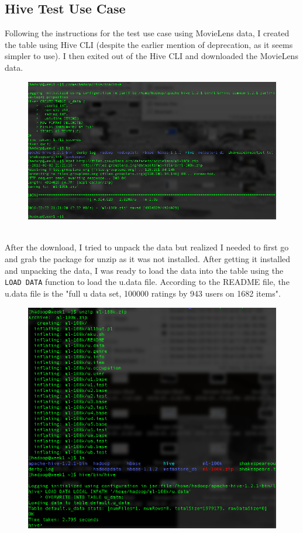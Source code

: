 \documentclass[10pt]{article}
\begin{document}
\subsection*{Hive Test Use Case}
Following the instructions for the test use case using MovieLens data, I created the table using Hive CLI (despite the earlier mention of deprecation, as it seems simpler to use). I then exited out of the Hive CLI and downloaded the MovieLens data.
\pagebreak
\begin{figure}[!h]
\includegraphics[scale=0.37]{create_table.png}
\centering
\end{figure}\\
\indent After the download, I tried to unpack the data but realized I needed to first go and grab the package for unzip as it was not installed. After getting it installed and unpacking the data, I was ready to load the data into the table using the \verb|LOAD DATA| function to load the u.data file. According to the README file, the u.data file is the "full u data set, 100000 ratings by 943 users on 1682 items".
\begin{figure}[!h]
\includegraphics[scale=0.37]{load_udata.png}
\centering
\end{figure}\\
\end{document}
